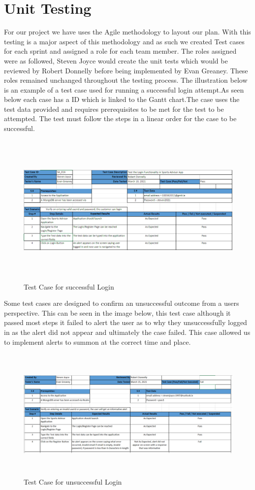 \section{Unit Testing}
For our project we have uses the Agile methodology to layout our plan. With this testing is a major aspect of this methodology and as such we created Test cases for each sprint and assigned a role for each team member. The roles assigned were as followed, Steven Joyce would create the unit tests which would be reviewed by Robert Donnelly before being implemented by Evan Greaney. These roles remained unchanged throughout the testing process.
\newline
\newline
The illustration below is an example of a test case used for running a successful login attempt.As seen below each case has a ID which is linked to the Gantt chart.The case uses the test data provided and requires prerequisites to be met for the test to be attempted. The test must follow the steps in a linear order for the case to be successful.
\begin{figure}[H]
    \centering
    \includegraphics[width=15cm, height = 7.5cm]{img/TestCasePass.PNG}
    \caption{Test Case for successful Login}
    \label{fig:altas config}
\end{figure}
Some test cases are designed to confirm an unsuccessful outcome from a users perspective. This can be seen in the image below, this test case although it passed most steps it failed to alert the user as to why they unsuccessfully logged in as the alert did not appear and ultimately the case failed. This case allowed us to implement alerts to summon at the correct time and place.
\begin{figure}[H]
    \centering
    \includegraphics[width=15cm, height = 6.5cm]{img/TestCaseFail.PNG}
    \caption{Test Case for unsuccessful Login}
    \label{fig:altas config}
\end{figure}
